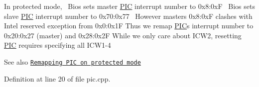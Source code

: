 In protected mode,~\newline
Bios sets master \hyperlink{namespace_p_i_c}{P\+IC} interrupt number to 0x8\+:0xF~\newline
Bios sets slave \hyperlink{namespace_p_i_c}{P\+IC} interrupt number to 0x70\+:0x77~\newline
However master\textquotesingle{}s 0x8\+:0xF clashes with Intel reserved exception from 0x0\+:0x1F Thus we remap \hyperlink{namespace_p_i_c}{P\+IC}\textquotesingle{}s interrupt number to 0x20\+:0x27 (master) and 0x28\+:0x2F While we only care about I\+C\+W2, resetting \hyperlink{namespace_p_i_c}{P\+IC} requires specifying all I\+C\+W1-\/4 \begin{DoxySeeAlso}{See also}
\href{https://wiki.osdev.org/8259_PIC#Protected_Mode}{\tt Remapping P\+IC on protected mode} 
\end{DoxySeeAlso}


Definition at line 20 of file pic.\+cpp.

